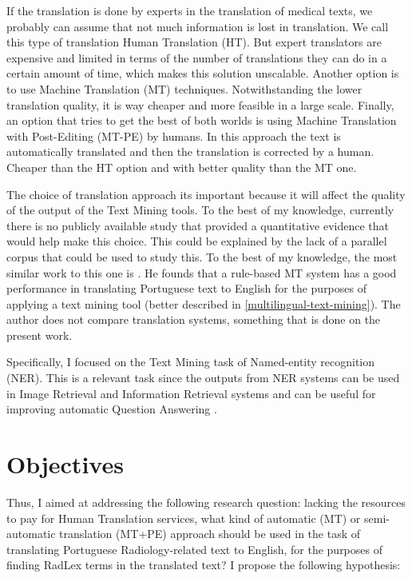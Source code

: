 If the translation is done by experts in the translation of medical texts, we probably can assume that not much information is lost in translation. We call this type of translation Human Translation (HT). But expert translators are expensive and limited in terms of the number of translations they can do in a certain amount of time, which makes this solution unscalable. Another option is to use Machine Translation (MT) techniques. Notwithstanding the lower translation quality, it is way cheaper and more feasible in a large scale. Finally, an option that tries to get the best of both worlds is using Machine Translation with Post-Editing (MT-PE) by humans. In this approach the text is automatically translated and then the translation is corrected by a human. Cheaper than the HT option and with better quality than the MT one.

The choice of translation approach its important because it will affect the quality of the output of the Text Mining tools. To the best of my knowledge, currently there is no publicly available study that provided a quantitative evidence that would help make this choice. This could be explained by the lack of a parallel corpus that could be used to study this. To the best of my knowledge, the most similar work to this one is \citep{Castilla2007a}. He founds that a rule-based MT system has a good performance in translating Portuguese text to English for the purposes of applying a text mining tool (better described in \ref{multilingual-text-mining}). The author does not compare translation systems, something that is done on the present work.

Specifically, I focused on the Text Mining task of Named-entity recognition (NER). This is a relevant task since the outputs from NER systems can be used in Image Retrieval \citep{Gerstmair2012} and Information Retrieval \citep{Antony2015} systems and can be useful for improving automatic Question Answering \citep{Toral2005}.

\section{Objectives}

Thus, I aimed at addressing the following research question: lacking the resources to pay for Human Translation services, what kind of automatic (MT) or semi-automatic translation (MT+PE) approach should be used in the task of translating Portuguese Radiology-related text to English, for the purposes of finding RadLex terms in the translated text? I propose the following hypothesis:

